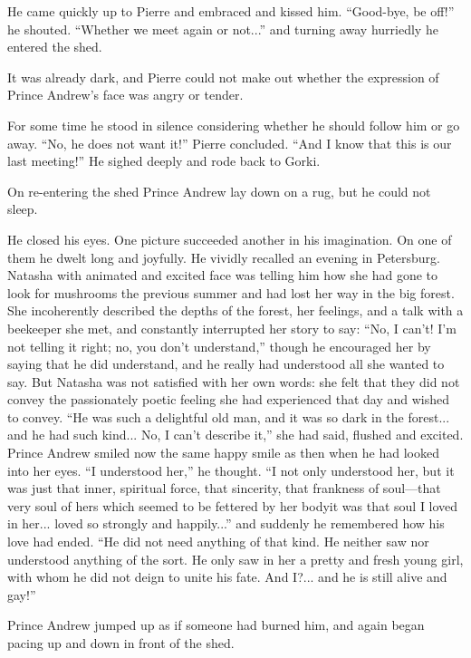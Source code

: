 He came quickly up to Pierre and embraced and kissed
him. ``Good-bye, be off!'' he shouted. ``Whether we meet again or
not...'' and turning away hurriedly he entered the shed.

It was already dark, and Pierre could not make out whether the
expression of Prince Andrew's face was angry or tender.

For some time he stood in silence considering whether he should
follow him or go away. ``No, he does not want it!'' Pierre
concluded. ``And I know that this is our last meeting!'' He
sighed deeply and rode back to Gorki.

On re-entering the shed Prince Andrew lay down on a rug, but he
could not sleep.

He closed his eyes. One picture succeeded another in his
imagination. On one of them he dwelt long and joyfully. He
vividly recalled an evening in Petersburg. Natasha with animated
and excited face was telling him how she had gone to look for
mushrooms the previous summer and had lost her way in the big
forest. She incoherently described the depths of the forest, her
feelings, and a talk with a beekeeper she met, and constantly
interrupted her story to say: ``No, I can't! I'm not telling it
right; no, you don't understand,'' though he encouraged her by
saying that he did understand, and he really had understood all
she wanted to say. But Natasha was not satisfied with her own
words: she felt that they did not convey the passionately poetic
feeling she had experienced that day and wished to convey. ``He
was such a delightful old man, and it was so dark in the
forest... and he had such kind... No, I can't describe it,'' she
had said, flushed and excited. Prince Andrew smiled now the same
happy smile as then when he had looked into her eyes. ``I
understood her,'' he thought. ``I not only understood her, but it
was just that inner, spiritual force, that sincerity, that
frankness of soul---that very soul of hers which seemed to be
fettered by her bodyit was that soul I loved in her... loved so
strongly and happily...'' and suddenly he remembered how his love
had ended. ``He did not need anything of that kind. He neither
saw nor understood anything of the sort. He only saw in her a
pretty and fresh young girl, with whom he did not deign to unite
his fate. And I?... and he is still alive and gay!''

Prince Andrew jumped up as if someone had burned him, and again
began pacing up and down in front of the shed.



